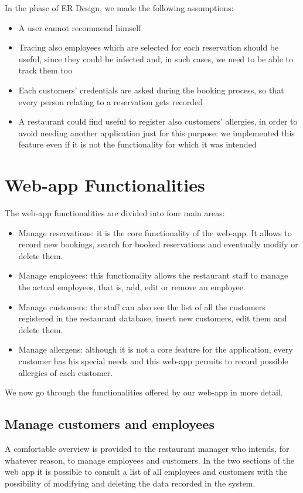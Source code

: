 \documentclass{article}
\begin{document}
    \vspace{5mm}
    In the phase of ER Design, we made the following assumptions:
    \begin{itemize}
        \item A user cannot recommend himself
        \item Tracing also employees which are selected for each reservation should be useful, since they could be infected and, in such cases, we need to be able to track them too
        \item Each customers' credentials are asked during the booking process, so that every person relating to a reservation gets recorded
        \item A restaurant could find useful to register also customers' allergies,
        in order to avoid needing another application just for this purpose: we implemented this feature even if it is not the functionality for which it was intended
    \end{itemize}

    \newpage

    \section*{Web-app Functionalities}
    The web-app functionalities are divided into four main areas:
    \begin{itemize}
        \item Manage reservations: it is the core functionality of the web-app. It allows
        to record new bookings, search for booked reservations and eventually
        modify or delete them.
        \item Manage employees: this functionality allows the restaurant staff to manage the actual employees, that is, add, edit or remove an employee.
        \item Manage customers: the staff can also see the list of all the customers registered in the restaurant database, insert new customers, edit them and delete them.
        \item Manage allergens: although it is not a core feature for the application, every customer has his special needs and this web-app permits to record possible allergies of each customer.
    \end{itemize}


    We now go through the functionalities offered by our web-app in more detail.

    \subsection*{Manage customers and employees}
    A comfortable overview is provided to the restaurant manager who intends, for whatever reason, to manage employees and customers. In the two sections of the web app it is possible to consult a list of all employees and customers with the possibility of modifying and deleting the data recorded in the system.
\end{document}
